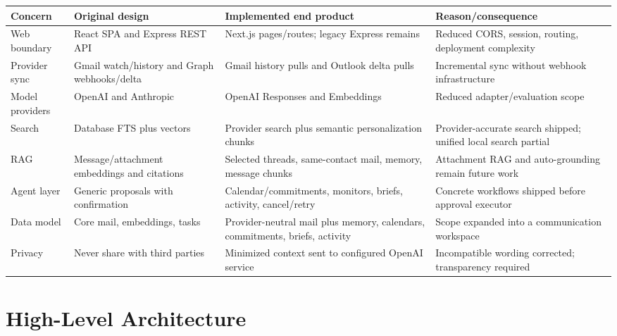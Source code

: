 \documentclass[11pt]{article}
\begin{document}
\begin{longtable}{@{}p{}p{}p{}p{}@{}}
\toprule
Concern & Original design & Implemented end product & Reason/consequence \\
\midrule
\endhead
\bottomrule
\endlastfoot
Web boundary & React SPA and Express REST API & Next.js pages/routes; legacy Express remains & Reduced CORS, session, routing, deployment complexity \\
Provider sync & Gmail watch/history and Graph webhooks/delta & Gmail history pulls and Outlook delta pulls & Incremental sync without webhook infrastructure \\
Model providers & OpenAI and Anthropic & OpenAI Responses and Embeddings & Reduced adapter/evaluation scope \\
Search & Database FTS plus vectors & Provider search plus semantic personalization chunks & Provider-accurate search shipped; unified local search partial \\
RAG & Message/attachment embeddings and citations & Selected threads, same-contact mail, memory, message chunks & Attachment RAG and auto-grounding remain future work \\
Agent layer & Generic proposals with confirmation & Calendar/commitments, monitors, briefs, activity, cancel/retry & Concrete workflows shipped before approval executor \\
Data model & Core mail, embeddings, tasks & Provider-neutral mail plus memory, calendars, commitments, briefs, activity & Scope expanded into a communication workspace \\
Privacy & Never share with third parties & Minimized context sent to configured OpenAI service & Incompatible wording corrected; transparency required \\
\end{longtable}

\section{High-Level Architecture}
\end{document}
